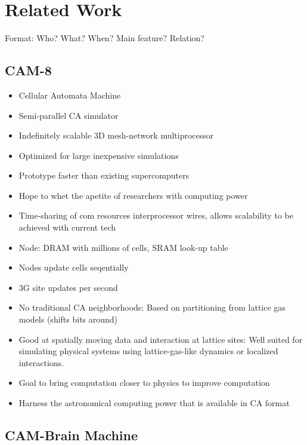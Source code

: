 
\section{Related Work}

\TODO

Format: Who? What? When? Main feature? Relation?

\subsection{CAM-8}

\begin{itemize}
    \item Cellular Automata Machine
    \item Semi-parallel CA simulator
    \item Indefinitely scalable 3D mesh-network multiprocessor
    \item Optimized for large inexpensive simulations
    \item Prototype faster than existing supercomputers
    \item Hope to whet the apetite of researchers with computing power
    \item Time-sharing of com resources interprocessor wires, allows scalability to be achieved with current tech
    \item Node: DRAM with millions of cells, SRAM look-up table
    \item Nodes update cells seqentially
    \item 3G site updates per second
    \item No traditional CA neighborhoods: Based on partitioning from lattice gas models (shifts bits around)
    \item Good at spatially moving data and interaction at lattice sites: Well suited for simulating physical systems using lattice-gas-like dynamics or localized interactions.
    \item Goal to bring computation closer to physics to improve computation
    \item Harness the astronomical computing power that is available in CA format
\end{itemize}

\subsection{CAM-Brain Machine}

